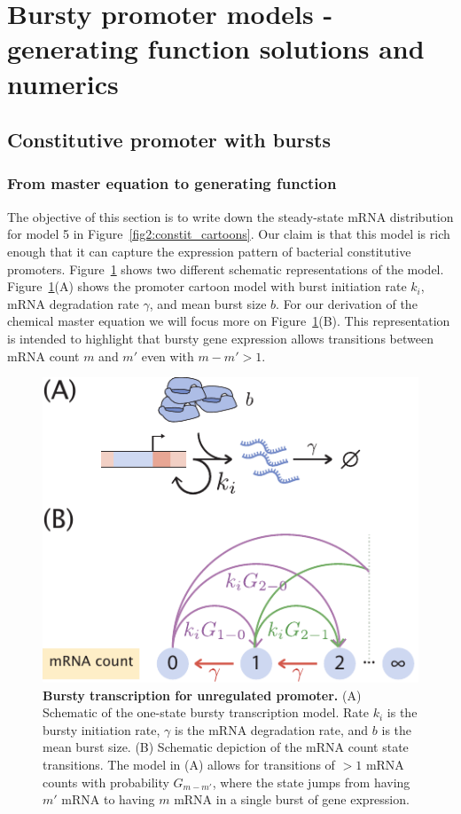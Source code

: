 \section{Bursty promoter models - generating function solutions and numerics}
\label{sec:gen_fcn_appdx}

\subsection{Constitutive promoter with bursts}

\subsubsection{From master equation to generating function}

The objective of this section is to write down the steady-state mRNA
distribution for model 5 in Figure~\ref{fig2:constit_cartoons}. Our claim is
that this model is rich enough that it can capture the expression pattern of
bacterial constitutive promoters. Figure~\ref{figS1:bursty_one_state} shows two
different schematic representations of the model.
Figure~\ref{figS1:bursty_one_state}(A) shows the promoter cartoon model with
burst initiation rate $k_i$, mRNA degradation rate $\gamma$, and mean burst size
$b$. For our derivation of the chemical master equation we will focus more on
Figure~\ref{figS1:bursty_one_state}(B). This representation is intended to
highlight that bursty gene expression allows transitions between mRNA count $m$
and $m'$ even with $m - m' > 1$.

\begin{figure}[h!]
\centering
\includegraphics{../../figures/si/figS0X_bursty_states.pdf}
\caption{
\textbf{Bursty transcription for unregulated promoter.}
(A) Schematic of the one-state bursty transcription model. Rate $k_i$ is the
bursty initiation rate, $\gamma$ is the mRNA degradation rate, and $b$ is the
mean burst size. (B) Schematic depiction of the mRNA count state transitions.
The model in (A) allows for transitions of $> 1$ mRNA counts with probability
$G_{m-m'}$, where the state jumps from having $m'$ mRNA to having $m$ mRNA in a
single burst of gene expression.}
\label{figS1:bursty_one_state}
\end{figure}

